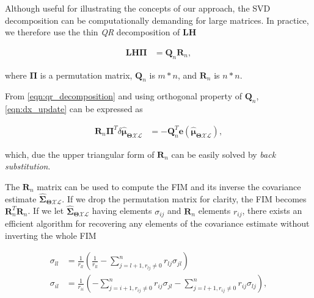 Although useful for illustrating the concepts of our approach, the SVD
decomposition can be computationally demanding for large matrices. In practice,
we therefore use the thin \emph{QR} decomposition of $\mathbf{L}\mathbf{H}$

\begin{equation}\label{eqn:qr_decomposition}
  \begin{aligned}
  \mathbf{L}\mathbf{H}\boldsymbol{\Pi} &= \mathbf{Q}_n\mathbf{R}_n,
  \end{aligned}
\end{equation}

where $\boldsymbol{\Pi}$ is a permutation matrix, $\mathbf{Q}_n$ is $m*n$, and
$\mathbf{R}_n$ is $n*n$.

From \eqref{eqn:qr_decomposition} and using orthogonal property of
$\mathbf{Q}_n$, \eqref{eqn:dx_update} can be expressed as

\begin{equation}\label{eqn:dx_qr_solve}
  \begin{aligned}
  \mathbf{R}_n\boldsymbol{\Pi}^{T}
    \delta\hat{\boldsymbol{\mu}}_{\boldsymbol{\Theta}\mathcal{X}\mathcal{L}} &=
    -\mathbf{Q}_n^T \mathbf{e}(
    \mathbf{\hat{\boldsymbol{\mu}}_{
    \boldsymbol{\Theta}\mathcal{X}\mathcal{L}}}),
  \end{aligned}
\end{equation}

which, due the upper triangular form of $\mathbf{R}_n$ can be easily solved by
\emph{back substitution}.

The $\mathbf{R}_n$ matrix can be used to compute the FIM and its
inverse the covariance estimate
$\hat{\boldsymbol{\Sigma}}_{\boldsymbol{\Theta}\mathcal{X}\mathcal{L}}$. If we
drop the permutation matrix for clarity, the FIM becomes
$\mathbf{R}_n^T\mathbf{R}_n$. If we let
$\hat{\boldsymbol{\Sigma}}_{\boldsymbol{\Theta}\mathcal{X}\mathcal{L}}$ having
elements $\sigma_{ij}$ and $\mathbf{R}_n$ elements $r_{ij}$, there exists an
efficient algorithm for recovering any elements of the covariance estimate
without inverting the whole FIM

\begin{equation}\label{eqn:covariance_QR}
  \begin{aligned}
  \sigma_{ll} &= \frac{1}{r_{ll}}(\frac{1}{r_{ll}} -
    \sum_{j = l + 1, r_{lj}\neq 0}^n r_{lj}\sigma_{jl})\\
  \sigma_{il} &= \frac{1}{r_{ii}}
    (-\sum_{j = i + 1, r_{ij}\neq 0}^n r_{ij}\sigma_{jl} -
    \sum_{j = l + 1, r_{ij}\neq 0}^n r_{ij}\sigma_{lj}),
  \end{aligned}
\end{equation}

